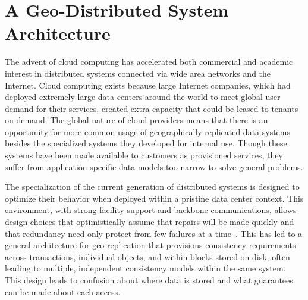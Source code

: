 
\renewcommand{\thechapter}{2}

\chapter{A Geo-Distributed System Architecture}
\label{ch:architecture}




The advent of cloud computing has accelerated both commercial and academic interest in distributed systems connected via wide area networks and the Internet.
Cloud computing exists because large Internet companies, which had deployed extremely large data centers around the world to meet global user demand for their services, created extra capacity that could be leased to tenants on-demand.
The global nature of cloud providers means that there is an opportunity for more common usage of geographically replicated data systems besides the specialized systems they developed for internal use.
Though these systems have been made available to customers as provisioned services, they suffer from application-specific data models too narrow to solve general problems.

The specialization of the current generation of distributed systems is designed to optimize their behavior when deployed within a pristine data center context.
This environment, with strong facility support and backbone communications, allows design choices that optimistically assume that repairs will be made quickly and that redundancy need only protect from few failures at a time~\cite{bermbach_eventual_2011,wada_data_2011,node_failure,jhawar_fault_2013}.
This has led to a general architecture for geo-replication that provisions consistency requirements across transactions, individual objects, and within blocks stored on disk, often leading to multiple, independent consistency models within the same system.
This design leads to confusion about where data is stored and what guarantees can be made about each access.

